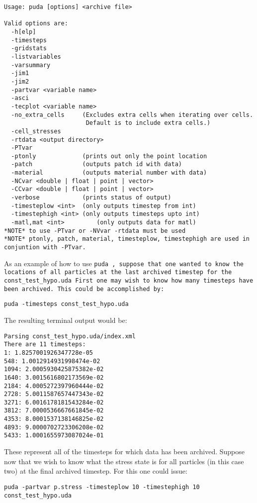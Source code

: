 \begin{Verbatim}[fontsize=\footnotesize]
Usage: puda [options] <archive file>

Valid options are:
  -h[elp]
  -timesteps
  -gridstats
  -listvariables
  -varsummary
  -jim1
  -jim2
  -partvar <variable name>
  -asci
  -tecplot <variable name>
  -no_extra_cells     (Excludes extra cells when iterating over cells.
                       Default is to include extra cells.)
  -cell_stresses
  -rtdata <output directory>
  -PTvar
  -ptonly             (prints out only the point location
  -patch              (outputs patch id with data)
  -material           (outputs material number with data)
  -NCvar <double | float | point | vector>
  -CCvar <double | float | point | vector>
  -verbose            (prints status of output)
  -timesteplow <int>  (only outputs timestep from int)
  -timestephigh <int> (only outputs timesteps upto int)
  -matl,mat <int>         (only outputs data for matl)
*NOTE* to use -PTvar or -NVvar -rtdata must be used
*NOTE* ptonly, patch, material, timesteplow, timestephigh are used in conjuntion with -PTvar.
\end{Verbatim}

As an example of how to use \tt puda \normalfont, suppose that one wanted to know the locations of all particles at the last archived timestep for the 
\tt const\_test\_hypo.uda \normalfont 
First one may wish to know how many timesteps have been archived.
This could be accomplished by:

\begin{Verbatim}[fontsize=\footnotesize]
 puda -timesteps const_test_hypo.uda
\end{Verbatim}
The resulting terminal output would be:
\begin{Verbatim}[fontsize=\footnotesize]
Parsing const_test_hypo.uda/index.xml
There are 11 timesteps:
1: 1.8257001926347728e-05
548: 1.0012914931998474e-02
1094: 2.0005930425875382e-02
1640: 3.0015616802173569e-02
2184: 4.0005272397960444e-02
2728: 5.0011587657447343e-02
3271: 6.0016178181543284e-02
3812: 7.0000536667661845e-02
4353: 8.0001537138146825e-02
4893: 9.0000702723306208e-02
5433: 1.0001655973087024e-01
\end{Verbatim}

These represent all of the timesteps for which data has been archived.  Suppose now that we wish to know what the stress state is for all particles (in this case two) at the final archived timestep.  For this one could issue:

\begin{Verbatim}[fontsize=\footnotesize]
puda -partvar p.stress -timesteplow 10 -timestephigh 10 const_test_hypo.uda
\end{Verbatim}

